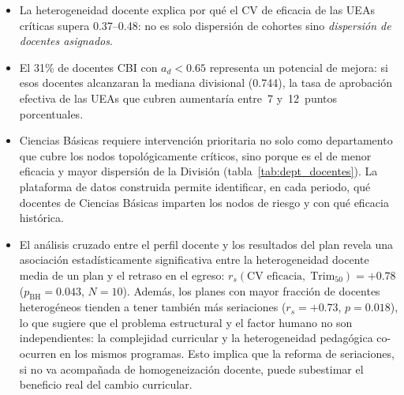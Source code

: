 \documentclass[11pt,letterpaper]{article}
\begin{document}
\begin{itemize}[leftmargin=2em]
  \item La heterogeneidad docente explica por qué el CV de eficacia de las
        UEAs críticas supera 0.37--0.48: no es solo dispersión de cohortes
        sino \emph{dispersión de docentes asignados}.
  \item El 31\% de docentes CBI con $a_d < 0.65$ representa un potencial
        de mejora: si esos docentes alcanzaran la mediana divisional (0.744),
        la tasa de aprobación efectiva de las UEAs que cubren aumentaría
        entre~7 y~12~puntos porcentuales.
  \item Ciencias Básicas requiere intervención prioritaria no solo como
        departamento que cubre los nodos topológicamente críticos, sino
        porque es el de menor eficacia y mayor dispersión de la División
        (tabla~\ref{tab:dept_docentes}).
        La plataforma de datos construida permite identificar, en cada
        periodo, qué docentes de Ciencias Básicas imparten los nodos de
        riesgo y con qué eficacia histórica.
  \item El análisis cruzado entre el perfil docente y los resultados del plan
        revela una asociación estadísticamente significativa entre la
        heterogeneidad docente media de un plan y el retraso en el egreso:
        $r_s(\text{CV eficacia},\;\mathrm{Trim}_{50}) = +0.78$
        ($p_{\mathrm{BH}} = 0.043$, $N=10$).
        Además, los planes con mayor fracción de docentes heterogéneos
        tienden a tener también más seriaciones
        ($r_s = +0.73$, $p = 0.018$), lo que sugiere que el problema
        estructural y el factor humano no son independientes: la complejidad
        curricular y la heterogeneidad pedagógica co-ocurren en los mismos
        programas.
        Esto implica que la reforma de seriaciones, si no va acompañada de
        homogeneización docente, puede subestimar el beneficio real del cambio
        curricular.
\end{itemize}
\end{document}
